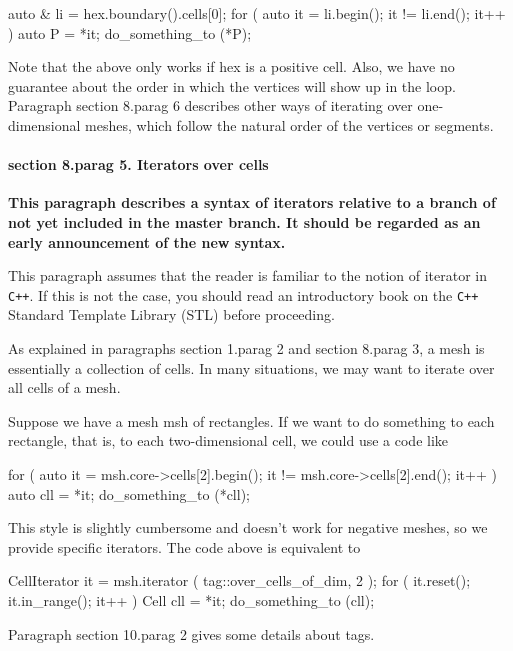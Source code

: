 \verbatim
   auto & li = hex.boundary().cells[0];
   for ( auto it = li.begin(); it != li.end(); it++ )
   { auto P = *it;  do_something_to (*P);  }
\endverbatim

Note that the above only works if {\codett hex} is a positive cell.
Also, we have no guarantee about the order in which the vertices will show up in the loop.
Paragraph \numb section 8.\numb parag 6 describes other ways of iterating over one-dimensional
meshes, which follow the natural order of the vertices or segments.


\paragraph{\numb section 8.\numb parag 5. Iterators over cells}

{\bf This paragraph describes a syntax of iterators relative to a branch of
{\maniFEM} not yet included in the {\codett master} branch.
It should be regarded as an early announcement of the new syntax.}

This paragraph assumes that the reader is familiar to the notion of iterator in {\tt C++}.
If this is not the case, you should read an introductory book on the {\tt C++}
Standard Template Library (STL) before proceeding.

As explained in paragraphs \numb section 1.\numb parag 2 and \numb section 8.\numb parag 3,
a mesh is essentially a collection of cells.
In many situations, we may want to iterate over all cells of a mesh.

Suppose we have a mesh {\codett msh} of rectangles.
If we want to do something to each rectangle, that is, to each two-dimensional cell,
we could use a code like

\verbatim
   for ( auto it = msh.core->cells[2].begin();
              it != msh.core->cells[2].end(); it++ )
   {  auto cll = *it;  do_something_to (*cll);  }
\endverbatim

This style is slightly cumbersome and doesn't work for negative meshes,
so we provide specific iterators.
The code above is equivalent to

\verbatim
   CellIterator it = msh.iterator ( tag::over_cells_of_dim, 2 );
   for ( it.reset(); it.in_range(); it++ )
   {  Cell cll = *it;  do_something_to (cll);  }
\endverbatim

Paragraph \numb section 10.\numb parag 2 gives some details about tags.

